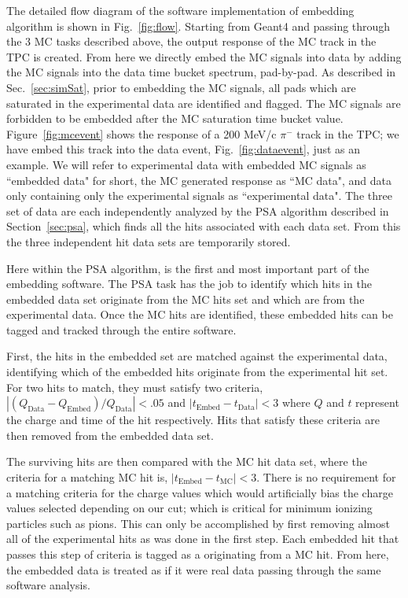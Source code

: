 The detailed flow diagram of the software implementation of embedding algorithm is shown in Fig.~\ref{fig:flow}. Starting from Geant4 and passing through the 3 MC tasks described above, the output response of the MC track in the TPC is created. From here we directly embed the MC signals into data by adding the MC signals into the data time bucket spectrum, pad-by-pad. As described in Sec.~\ref{sec:simSat}, prior to embedding the MC signals, all pads which are saturated in the experimental data are identified and flagged. The MC signals are forbidden to be embedded after the MC saturation time bucket value. Figure~\ref{fig:mcevent} shows the response of a 200 MeV/c $\pi^-$ track in the TPC; we have embed this track into the data event, Fig.~\ref{fig:dataevent}, just as an example. We will refer to experimental data with embedded MC signals as ``embedded data" for short, the MC generated response as ``MC data", and data only containing only the experimental signals as ``experimental data". The three set of data are each independently analyzed by the PSA algorithm described in Section~\ref{sec:psa},  which finds all the hits associated with each data set. From this the three independent hit data sets are temporarily stored. 

Here within the PSA algorithm, is the first and most important part of the embedding software. The PSA task has the job to identify which hits in the embedded data set originate from the MC hits set and which are from the experimental data. Once the MC hits are identified, these embedded hits can be tagged and tracked through the entire software. 

First, the hits in the embedded set are matched against the experimental data, identifying which of the embedded hits originate from the experimental hit set. For two hits to match, they must satisfy two criteria, $\left|(Q_{\mathrm{Data}} - Q_{\mathrm{Embed} })/Q_{\mathrm{Data}}\right| < .05$ and $\left|t_{\mathrm{Embed} } - t_{\mathrm{Data} }\right| < 3$ where $Q$ and $t$ represent the charge and time of the hit respectively. Hits that satisfy these criteria are then removed from the embedded data set.

The surviving hits are then compared with the MC hit data set, where the criteria for a matching MC hit is, $\left|t_{\mathrm{Embed} } - t_{\mathrm{MC} }\right| < 3$.  There is no requirement for a matching criteria for the charge values which would artificially bias the charge values selected depending on our cut; which is critical for minimum ionizing particles such as pions.  This can only be accomplished by first removing almost all of the experimental hits as was done in the first step. Each embedded hit that passes this step of criteria is tagged as a originating from a MC hit. From here, the embedded data is treated as if it were real data passing through the same software analysis. 

